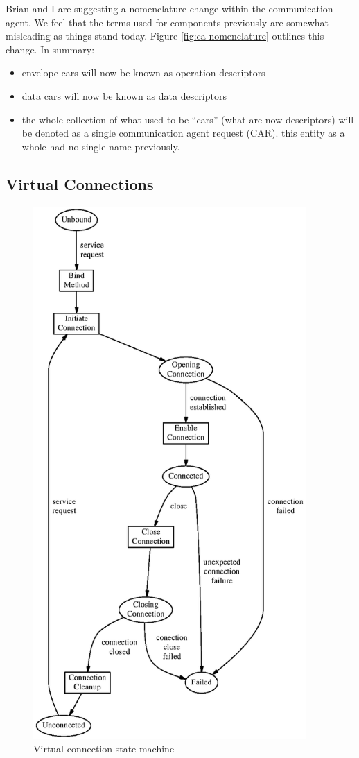\documentclass[11pt,letterpaper]{article}
\begin{document}
Brian and I are suggesting a nomenclature change within the communication
agent.  We feel that the terms used for components previously are somewhat
misleading as things stand today.  Figure \ref{fig:ca-nomenclature} outlines
this change.  In summary:
\begin{itemize}
\item envelope cars will now be known as operation descriptors
\item data cars will now be known as data descriptors
\item the whole collection of what used to be ``cars'' (what are now
  descriptors) will be denoted as a single communication agent request (CAR).
  this entity as a whole had no single name previously.
\end{itemize}


\subsection{Virtual Connections}

\begin{figure}
\begin{center}
\includegraphics[height=8in]{vc-sm.eps}
\caption{\label{fig:vc-sm} Virtual connection state machine}
\end{center}
\end{figure}
\end{document}
